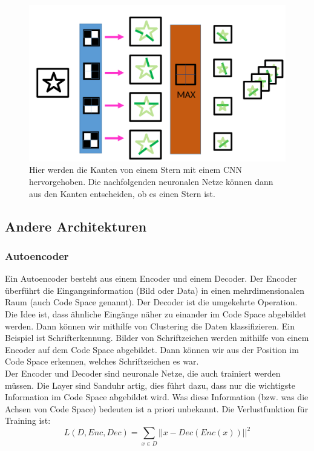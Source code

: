 \begin{figure}[h]
    \centering
    \includegraphics[scale= 0.3]{Figures/ML-conv.png}
    \caption{Hier werden die Kanten von einem Stern mit einem CNN hervorgehoben. Die nachfolgenden neuronalen Netze können dann aus den Kanten entscheiden, ob es einen Stern ist.}
    \label{fig:ml-conv}
\end{figure}
\subsection{Andere Architekturen}
\subsubsection{Autoencoder}
Ein Autoencoder besteht aus einem Encoder und einem Decoder. Der Encoder überführt die Eingangsinformation (Bild oder Data) in einen mehrdimensionalen Raum (auch Code Space genannt). Der Decoder ist die umgekehrte Operation. Die Idee ist, dass ähnliche Eingänge näher zu einander im Code Space abgebildet werden. Dann können wir mithilfe von Clustering die Daten klassifizieren. Ein Beispiel ist Schrifterkennung. Bilder von Schriftzeichen werden mithilfe von einem Encoder auf dem Code Space abgebildet. Dann können wir aus der Position im Code Space erkennen, welches Schriftzeichen es war.\\

Der Encoder und Decoder sind neuronale Netze, die auch trainiert werden müssen. Die Layer sind Sanduhr artig, dies führt dazu, dass nur die wichtigste Information im Code Space abgebildet wird. Was diese Information (bzw. was die Achsen von Code Space) bedeuten ist a priori unbekannt. Die Verlustfunktion für Training ist:
\begin{equation}
    L(D, Enc,Dec) = \sum_{x\in D} || x -Dec(Enc(x))||^2
\end{equation}

